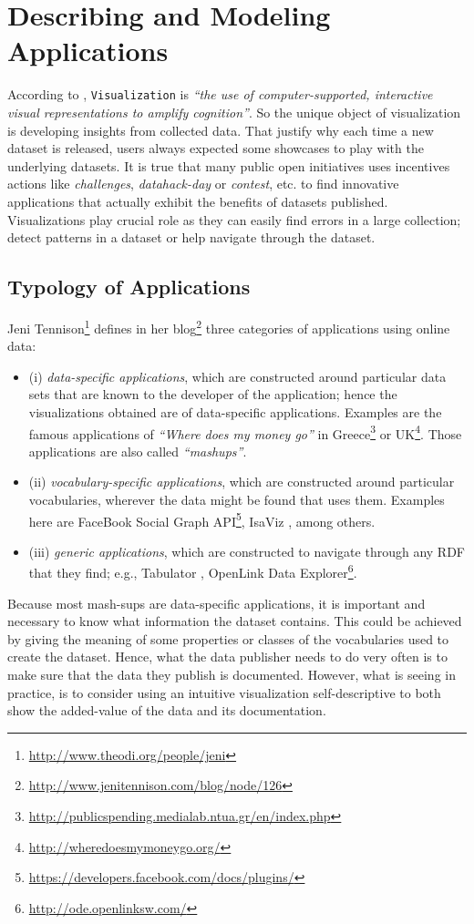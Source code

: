 \section{Describing and Modeling Applications}
\label{sec:apps}
According to \cite{card99}, \texttt{Visualization} is \textit{ ``the use of computer-supported, interactive visual representations to amplify cognition''}. So the unique object of visualization is developing insights from collected data. That justify why each time a new dataset is released, users always expected some showcases to play with the underlying datasets. It is true that many public open initiatives uses incentives actions like \textit{challenges}, \textit{datahack-day} or \textit{contest}, etc. to find innovative applications that actually exhibit the benefits of datasets published. Visualizations play crucial role as they can easily find errors in a large collection; detect patterns in a dataset or help navigate through the dataset.

\subsection{Typology of Applications}
Jeni Tennison\footnote{\url{http://www.theodi.org/people/jeni}} defines  in her blog\footnote{\url{http://www.jenitennison.com/blog/node/126}} three categories of applications using online data:
\begin{itemize}
\item (i) \textit{data-specific applications}, which are constructed around particular data sets that are known to the developer of the application; hence the visualizations obtained are of data-specific applications. Examples are the famous applications of \textit{``Where does my money go''}  in Greece\footnote{\url{http://publicspending.medialab.ntua.gr/en/index.php}} or UK\footnote{\url{http://wheredoesmymoneygo.org/}}. Those applications are also called \textit{``mashups''}.
\item (ii) \textit{vocabulary-specific applications}, which are constructed around particular vocabularies, wherever the data might be found that uses them. Examples here are FaceBook Social Graph API\footnote{\url{https://developers.facebook.com/docs/plugins/}}, IsaViz  \cite{isaviz}, among others.
\item (iii) \textit{generic applications}, which are constructed to navigate through any RDF that they find; e.g., Tabulator \cite{tabulator06}, OpenLink Data Explorer\footnote{\url{http://ode.openlinksw.com/}}.

\end{itemize}
Because most mash-sups are data-specific applications, it is important and necessary to  know what information the dataset contains. This could be achieved by giving the meaning of some properties or classes of the vocabularies used to create the dataset. Hence, what the data publisher needs to do very often is to make sure that the data they publish is documented. However, what is seeing in practice, is to consider using an intuitive visualization self-descriptive to both show the added-value of the data and its documentation.

